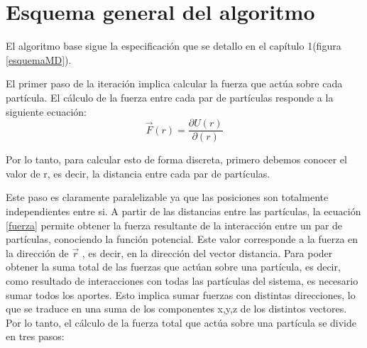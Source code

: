 \section{Esquema general del algoritmo}

El algoritmo base sigue la especificación que se detallo en el capítulo 1(figura \ref{esquemaMD}). 

El primer paso de la iteración implica calcular la fuerza que actúa sobre cada partícula. 
El cálculo de la fuerza entre cada par de partículas responde a la siguiente ecuación: \begin{equation} \label{fuerza}\vec{F}(r)=\dfrac{\partial U(r)}{ \partial(r)}\end{equation}
                                                                                                                                                   
Por lo tanto, para calcular esto de forma discreta, primero debemos conocer el valor de r, es decir, la distancia entre cada par de partículas.

Este paso es claramente paralelizable ya que las posiciones son totalmente independientes entre si.
A partir de las distancias entre las partículas, la ecuación \ref{fuerza} permite obtener la fuerza resultante de la interacción entre un par de partículas, conociendo la función potencial.
Este valor corresponde a la fuerza en la dirección de $\vec{r}$ , es decir, en la dirección del vector distancia. 
Para poder obtener la suma total de las fuerzas que actúan sobre una partícula, es decir, como resultado de interacciones con todas las partículas del sistema,
es necesario sumar todos los aportes. Esto implica sumar fuerzas con distintas direcciones, lo que se traduce en una suma de los componentes x,y,z de los distintos vectores. 
Por lo tanto, el cálculo de la fuerza total que actúa sobre una partícula se divide en tres pasos:

